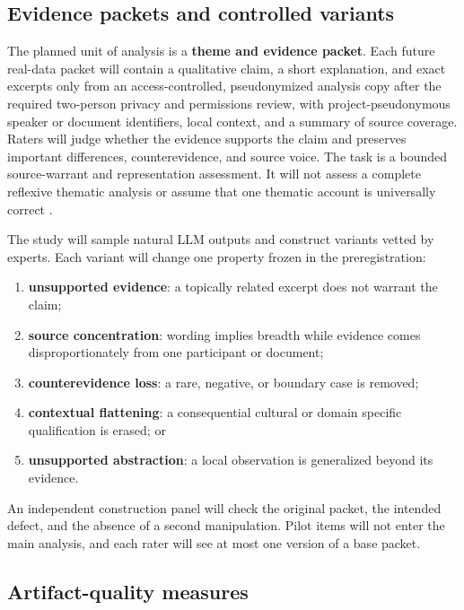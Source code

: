\subsection{Evidence packets and controlled variants}

The planned unit of analysis is a \textbf{theme and evidence packet}. Each future real-data packet will contain a qualitative claim, a short explanation, and exact excerpts only from an access-controlled, pseudonymized analysis copy after the required two-person privacy and permissions review, with project-pseudonymous speaker or document identifiers, local context, and a summary of source coverage. Raters will judge whether the evidence supports the claim and preserves important differences, counterevidence, and source voice. The task is a bounded source-warrant and representation assessment. It will not assess a complete reflexive thematic analysis or assume that one thematic account is universally correct \citep{braun2021can,braun2021quality}.

The study will sample natural LLM outputs and construct variants vetted by experts. Each variant will change one property frozen in the preregistration:

\begin{enumerate}
    \item \textbf{unsupported evidence}: a topically related excerpt does not warrant the claim;
    \item \textbf{source concentration}: wording implies breadth while evidence comes disproportionately from one participant or document;
    \item \textbf{counterevidence loss}: a rare, negative, or boundary case is removed;
    \item \textbf{contextual flattening}: a consequential cultural or domain specific qualification is erased; or
    \item \textbf{unsupported abstraction}: a local observation is generalized beyond its evidence.
\end{enumerate}

An independent construction panel will check the original packet, the intended defect, and the absence of a second manipulation. Pilot items will not enter the main analysis, and each rater will see at most one version of a base packet.

\subsection{Artifact-quality measures}

